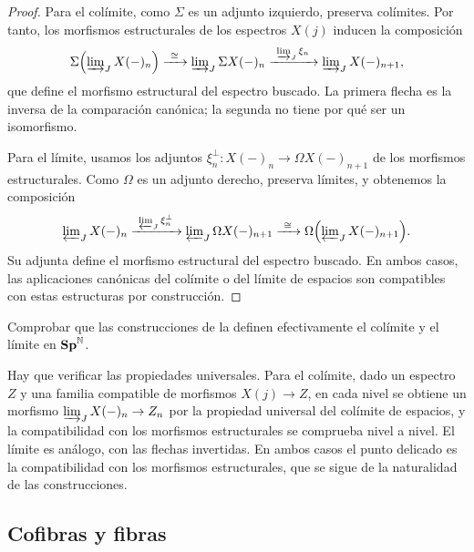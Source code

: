 \begin{proof}
Para el colímite, como $\Sigma$ es un adjunto izquierdo, preserva colímites. Por tanto, los morfismos estructurales de los espectros $X(j)$ inducen la composición
\[
\Sigma\Bigl(\varinjlim\nolimits_J X(-)_n\Bigr)
\xrightarrow{\ \cong\ }
\varinjlim\nolimits_J\Sigma X(-)_n
\xrightarrow{\ \varinjlim\nolimits_J\xi_n\ }
\varinjlim\nolimits_J X(-)_{n+1},
\]
que define el morfismo estructural del espectro buscado. La primera flecha es la inversa de la comparación canónica; la segunda no tiene por qué ser un isomorfismo.

Para el límite, usamos los adjuntos $\xi_n^\perp\colon X(-)_n\to\Omega X(-)_{n+1}$ de los morfismos estructurales. Como $\Omega$ es un adjunto derecho, preserva límites, y obtenemos la composición
\[
\varprojlim\nolimits_J X(-)_n
\xrightarrow{\ \varprojlim_J\xi_n^\perp\ }
\varprojlim\nolimits_J\Omega X(-)_{n+1}
\xrightarrow{\ \cong\ }
\Omega\Bigl(\varprojlim\nolimits_J X(-)_{n+1}\Bigr).
\]
Su adjunta define el morfismo estructural del espectro buscado. En ambos casos, las aplicaciones canónicas del colímite o del límite de espacios son compatibles con estas estructuras por construcción.
\end{proof}

\begin{ejer}\label{ejer:colimite-es-el-colimite}
Comprobar que las construcciones de la  definen efectivamente el colímite y el límite en $\mathbf{Sp}^{\mathbb{N}}$.
\end{ejer}

\begin{sol}
Hay que verificar las propiedades universales. Para el colímite, dado un espectro $Z$ y una familia compatible de morfismos $X(j)\to Z$, en cada nivel se obtiene un morfismo $\varinjlim\nolimits_JX(-)_n\to Z_n$ por la propiedad universal del colímite de espacios, y la compatibilidad con los morfismos estructurales se comprueba nivel a nivel. El límite es análogo, con las flechas invertidas. En ambos casos el punto delicado es la compatibilidad con los morfismos estructurales, que se sigue de la naturalidad de las construcciones.
\end{sol}

\subsection{Cofibras y fibras}

